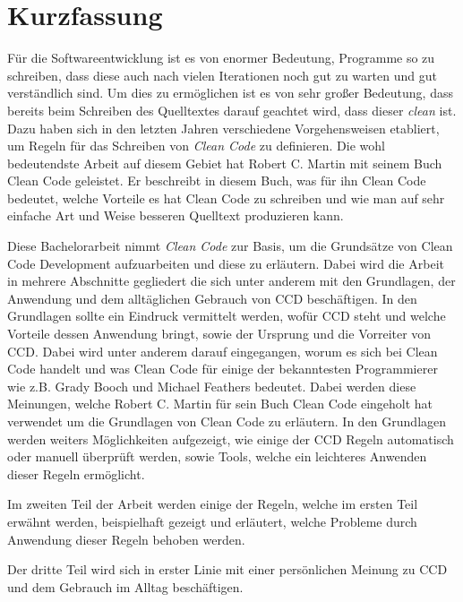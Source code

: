 \chapter{Kurzfassung}

Für die Softwareentwicklung ist es von enormer Bedeutung, Programme so zu schreiben, dass diese auch nach vielen Iterationen noch gut zu warten und gut verständlich sind. Um dies zu ermöglichen ist es von sehr großer Bedeutung, dass bereits beim Schreiben des Quelltextes darauf geachtet wird, dass dieser \textit{clean} ist. Dazu haben sich in den letzten Jahren verschiedene Vorgehensweisen etabliert, um Regeln für das Schreiben von \textit{Clean Code} zu definieren. Die wohl bedeutendste Arbeit auf diesem Gebiet hat Robert C. Martin mit seinem Buch Clean Code \cite{Martin2008} geleistet. Er beschreibt in diesem Buch, was für ihn Clean Code bedeutet, welche Vorteile es hat Clean Code zu schreiben und wie man auf sehr einfache Art und Weise besseren Quelltext produzieren kann. 

Diese Bachelorarbeit nimmt \textit{Clean Code} \cite{Martin2008} zur Basis, um die Grundsätze von Clean Code Development aufzuarbeiten und diese zu erläutern. Dabei wird die Arbeit in mehrere Abschnitte gegliedert die sich unter anderem mit den Grundlagen, der Anwendung und dem alltäglichen Gebrauch von CCD beschäftigen. In den Grundlagen sollte ein Eindruck vermittelt werden, wofür CCD steht und welche Vorteile dessen Anwendung bringt, sowie der Ursprung und die Vorreiter von CCD. Dabei wird unter anderem darauf eingegangen, worum es sich bei Clean Code handelt und was Clean Code für einige der bekanntesten Programmierer wie z.B. Grady Booch und Michael Feathers bedeutet. Dabei werden diese Meinungen, welche Robert C. Martin für sein Buch Clean Code \cite{Martin2008} eingeholt hat verwendet um die Grundlagen von Clean Code zu erläutern. In den Grundlagen werden weiters Möglichkeiten aufgezeigt, wie einige der CCD Regeln automatisch oder manuell überprüft werden, sowie Tools, welche ein leichteres Anwenden dieser Regeln ermöglicht.

Im zweiten Teil der Arbeit werden einige der Regeln, welche im ersten Teil erwähnt werden, beispielhaft gezeigt und erläutert, welche Probleme durch Anwendung dieser Regeln behoben werden. 

Der dritte Teil wird sich in erster Linie mit einer persönlichen Meinung zu CCD und dem Gebrauch im Alltag beschäftigen.